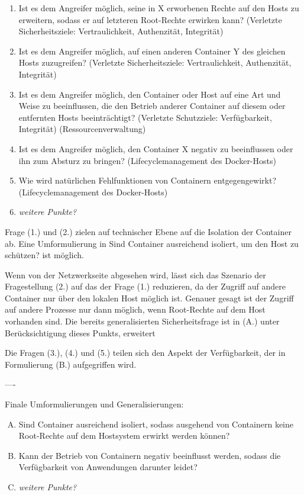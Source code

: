 \documentclass[../main.tex]{subfiles}
\begin{document}
  \begin{enumerate}[(1)]
    \item Ist es dem Angreifer möglich, seine in X erworbenen Rechte auf den Hosts zu erweitern, sodass er auf letzteren Root-Rechte erwirken kann? (Verletzte Sicherheitsziele: Vertraulichkeit, Authenzität, Integrität)
    \item Ist es dem Angreifer möglich, auf einen anderen Container Y des gleichen Hosts zuzugreifen? (Verletzte Sicherheitsziele: Vertraulichkeit, Authenzität, Integrität)
    \item Ist es dem Angreifer möglich, den Container oder Host auf eine Art und Weise zu beeinflussen, die den Betrieb anderer Container auf diesem oder entfernten Hosts beeinträchtigt? (Verletzte Schutzziele: Verfügbarkeit, Integrität) (Ressourcenverwaltung)
    \item Ist es dem Angreifer möglich, den Container X negativ zu beeinflussen oder ihn zum Absturz zu bringen? (Lifecyclemanagement des Docker-Hosts)
    \item Wie wird natürlichen Fehlfunktionen von Containern entgegengewirkt? (Lifecyclemanagement des Docker-Hosts)
    \item \emph{weitere Punkte?}
  \end{enumerate}

  Frage (1.) und (2.) zielen auf technischer Ebene auf die Isolation der Container ab. Eine Umformulierung in \glqq{}Sind Container ausreichend isoliert, um den Host zu schützen?\grqq{} ist möglich.

  Wenn von der Netzwerkseite abgesehen wird, lässt sich das Szenario der Fragestellung (2.) auf das der Frage (1.) reduzieren, da der Zugriff auf andere Container nur über den lokalen Host möglich ist. Genauer gesagt ist der Zugriff auf andere Prozesse nur dann möglich, wenn Root-Rechte auf dem Host vorhanden sind. Die bereits generalisierten Sicherheitsfrage ist in (A.) unter Berücksichtigung dieses Punkts, erweitert

  Die Fragen (3.), (4.) und (5.) teilen sich den Aspekt der Verfügbarkeit, der in Formulierung (B.) aufgegriffen wird.

  ----

  Finale Umformulierungen und Generalisierungen:

  \begin{enumerate}[(A)]
    \item Sind Container ausreichend isoliert, sodass ausgehend von Containern keine Root-Rechte auf dem Hostsystem erwirkt werden können?
    \item Kann der Betrieb von Containern negativ beeinflusst werden, sodass die Verfügbarkeit von Anwendungen darunter leidet?
    \item \emph{weitere Punkte?}
  \end{enumerate}
\end{document}
